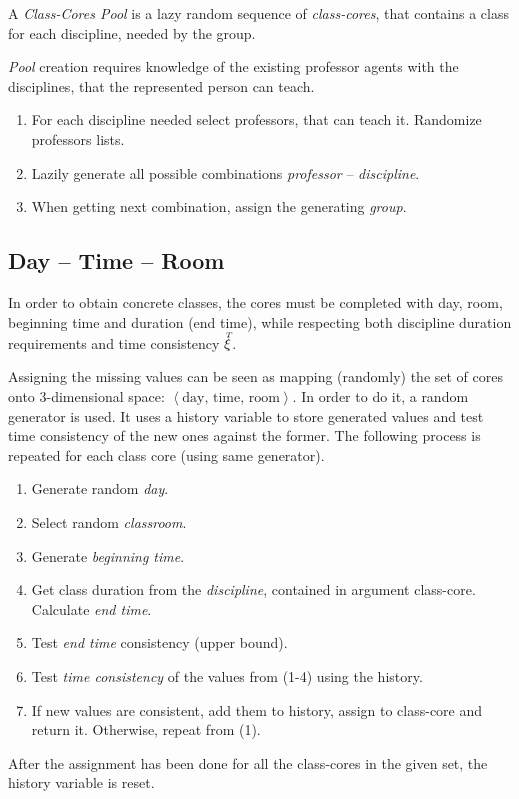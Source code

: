 \documentclass[../../header]{subfiles}
\begin{document}
A \emph{Class-Cores Pool} is a lazy random sequence of \emph{class-cores},
that contains a class for each discipline, needed by the group.

\emph{Pool} creation requires knowledge of the existing professor agents with
the disciplines, that the represented person can teach.
\begin{enumerate}
  \item For each discipline needed select professors, that can teach it.
        Randomize professors lists.
  \item Lazily generate all possible combinations \emph{professor} -- \emph{discipline}.
  \item When getting next combination, assign the generating \emph{group}.
\end{enumerate}

\subsection{Day -- Time -- Room}
\label{sec:solution-DTR}

In order to obtain concrete classes, the cores must be completed with day, room,
beginning time and duration (end time), while respecting both discipline duration
requirements and time consistency $\accentset{T}{\xi}$.

Assigning the missing values can be seen as mapping (randomly) the set of cores onto
3-dimensional space: $\left< \text{day, time, room} \right>$.
In order to do it, a random generator is used. It uses a history variable to
store generated values and test time consistency of the new ones against the former.
The following process is repeated for each class core (using same generator).
\begin{enumerate}
  \item Generate random \emph{day}.
  \item Select random \emph{classroom}.
  \item Generate \emph{beginning time}.
  \item Get class duration from the \emph{discipline}, contained in argument class-core.
        Calculate \emph{end time}.
  \item Test \emph{end time} consistency (upper bound).
  \item Test \emph{time consistency} of the values from (1-4) using the history.
  \item If new values are consistent, add them to history, assign to class-core
        and return it.
        Otherwise, repeat from (1).

\end{enumerate}
After the assignment has been done for all the class-cores in the given set,
the history variable is reset.
\end{document}
